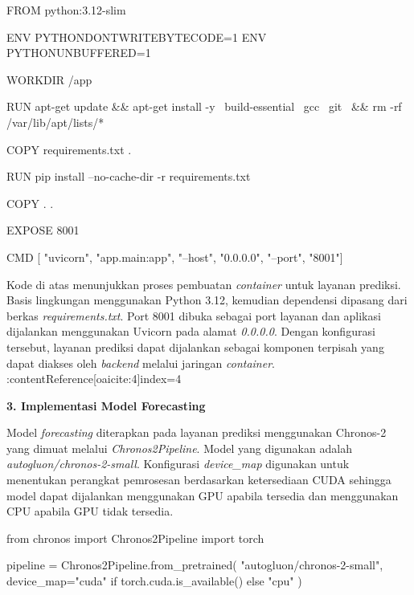 \begin{code}
\begin{ignasicblock}
FROM python:3.12-slim

ENV PYTHONDONTWRITEBYTECODE=1
ENV PYTHONUNBUFFERED=1

WORKDIR /app

RUN apt-get update && apt-get install -y \
    build-essential \
    gcc \
    git \
    && rm -rf /var/lib/apt/lists/*

COPY requirements.txt .

RUN pip install --no-cache-dir -r requirements.txt

COPY . .

EXPOSE 8001

CMD [ "uvicorn", "app.main:app", "--host", "0.0.0.0", "--port", "8001"]
\end{ignasicblock}
\end{code}

Kode di atas menunjukkan proses pembuatan \textit{container} untuk layanan prediksi. Basis lingkungan menggunakan Python 3.12, kemudian dependensi dipasang dari berkas \textit{requirements.txt}. Port 8001 dibuka sebagai port layanan dan aplikasi dijalankan menggunakan Uvicorn pada alamat \textit{0.0.0.0}. Dengan konfigurasi tersebut, layanan prediksi dapat dijalankan sebagai komponen terpisah yang dapat diakses oleh \textit{backend} melalui jaringan \textit{container}. :contentReference[oaicite:4]{index=4}

\vspace{0.5em}
\noindent\textbf{3. Implementasi Model Forecasting}
\vspace{0.5em}

Model \textit{forecasting} diterapkan pada layanan prediksi menggunakan Chronos-2 yang dimuat melalui \textit{Chronos2Pipeline}. Model yang digunakan adalah \textit{autogluon/chronos-2-small}. Konfigurasi \textit{device\_map} digunakan untuk menentukan perangkat pemrosesan berdasarkan ketersediaan CUDA sehingga model dapat dijalankan menggunakan GPU apabila tersedia dan menggunakan CPU apabila GPU tidak tersedia.

\begin{code}
\begin{ignasicblock}
from chronos import Chronos2Pipeline
import torch

pipeline = Chronos2Pipeline.from_pretrained(
    "autogluon/chronos-2-small",
    device_map="cuda" if torch.cuda.is_available() else "cpu"
)
\end{ignasicblock}
\end{code}

